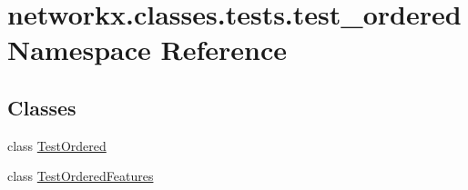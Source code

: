 \hypertarget{namespacenetworkx_1_1classes_1_1tests_1_1test__ordered}{}\section{networkx.\+classes.\+tests.\+test\+\_\+ordered Namespace Reference}
\label{namespacenetworkx_1_1classes_1_1tests_1_1test__ordered}
\subsection*{Classes}
\begin{DoxyCompactItemize}
\item 
class \hyperlink{classnetworkx_1_1classes_1_1tests_1_1test__ordered_1_1TestOrdered}{Test\+Ordered}
\item 
class \hyperlink{classnetworkx_1_1classes_1_1tests_1_1test__ordered_1_1TestOrderedFeatures}{Test\+Ordered\+Features}
\end{DoxyCompactItemize}
